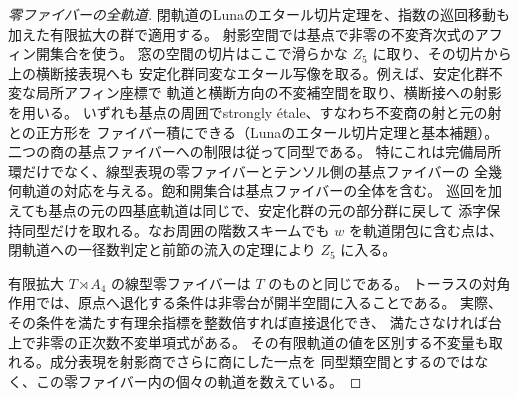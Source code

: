 \begin{proof}[零ファイバーの全軌道]
閉軌道のLunaのエタール切片定理を、指数の巡回移動も加えた有限拡大の群で適用する。
射影空間では基点で非零の不変斉次式のアフィン開集合を使う。
窓の空間の切片はここで滑らかな $Z_5$ に取り、その切片から上の横断接表現へも
安定化群同変なエタール写像を取る。例えば、安定化群不変な局所アフィン座標で
軌道と横断方向の不変補空間を取り、横断接への射影を用いる。
いずれも基点の周囲でstrongly étale、すなわち不変商の射と元の射との正方形を
ファイバー積にできる（Lunaのエタール切片定理と基本補題）。
二つの商の基点ファイバーへの制限は従って同型である。
特にこれは完備局所環だけでなく、線型表現の零ファイバーとテンソル側の基点ファイバーの
全幾何軌道の対応を与える。飽和開集合は基点ファイバーの全体を含む。
巡回を加えても基点の元の四基底軌道は同じで、安定化群の元の部分群に戻して
添字保持同型だけを取れる。なお周囲の階数スキームでも $w$ を軌道閉包に含む点は、
閉軌道への一径数判定と前節の流入の定理により $Z_5$ に入る。

有限拡大 $T\rtimes A_4$ の線型零ファイバーは $T$ のものと同じである。
トーラスの対角作用では、原点へ退化する条件は非零台が開半空間に入ることである。
実際、その条件を満たす有理余指標を整数倍すれば直接退化でき、
満たさなければ台上で非零の正次数不変単項式がある。
その有限軌道の値を区別する不変量も取れる。成分表現を射影商でさらに商にした一点を
同型類空間とするのではなく、この零ファイバー内の個々の軌道を数えている。
\end{proof}

